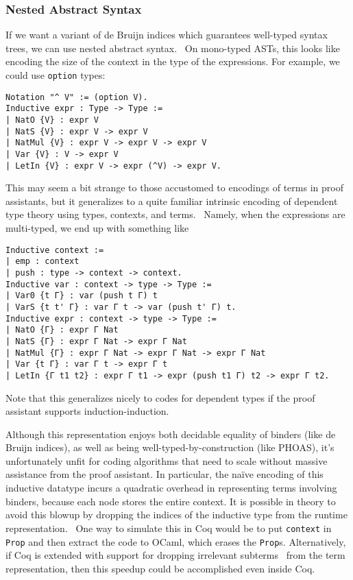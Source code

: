 \subsubsection{Nested Abstract Syntax} \label{sec:binders:nested-abstract-syntax}
If we want a variant of de Bruijn indices which guarantees well-typed syntax trees, we can use nested abstract syntax.~\cite{Nested2012Hirschowitz,deBruijn1999Bird}
On mono-typed ASTs, this looks like encoding the size of the context in the type of the expressions.
For example, we could use \texttt{option} types:~\cite{Nested2012Hirschowitz}
\begin{verbatim}
Notation "^ V" := (option V).
Inductive expr : Type -> Type :=
| NatO {V} : expr V
| NatS {V} : expr V -> expr V
| NatMul {V} : expr V -> expr V -> expr V
| Var {V} : V -> expr V
| LetIn {V} : expr V -> expr (^V) -> expr V.
\end{verbatim}

This may seem a bit strange to those accustomed to encodings of terms in proof assistants, but it generalizes to a quite familiar intrinsic encoding of dependent type theory using types, contexts, and terms.~\cite{Strongly2012Benton}
Namely, when the expressions are multi-typed, we end up with something like
\begin{verbatim}
Inductive context :=
| emp : context
| push : type -> context -> context.
Inductive var : context -> type -> Type :=
| Var0 {t Γ} : var (push t Γ) t
| VarS {t t' Γ} : var Γ t -> var (push t' Γ) t.
Inductive expr : context -> type -> Type :=
| NatO {Γ} : expr Γ Nat
| NatS {Γ} : expr Γ Nat -> expr Γ Nat
| NatMul {Γ} : expr Γ Nat -> expr Γ Nat -> expr Γ Nat
| Var {t Γ} : var Γ t -> expr Γ t
| LetIn {Γ t1 t2} : expr Γ t1 -> expr (push t1 Γ) t2 -> expr Γ t2.
\end{verbatim}

Note that this generalizes nicely to codes for dependent types if the proof assistant supports induction-induction.

Although this representation enjoys both decidable equality of binders (like de Bruijn indices), as well as being well-typed-by-construction (like PHOAS), it's unfortunately unfit for coding algorithms that need to scale without massive assistance from the proof assistant.
In particular, the naïve encoding of this inductive datatype incurs a quadratic overhead in representing terms involving binders, because each node stores the entire context.
It is possible in theory to avoid this blowup by dropping the indices of the inductive type from the runtime representation.~\cite{Inductive2003Brady}
One way to simulate this in Coq would be to put \texttt{context} in \texttt{Prop} and then extract the code to OCaml, which erases the \texttt{Prop}s.
Alternatively, if Coq is extended with support for dropping irrelevant subterms~\cite{sprop} from the term representation, then this speedup could be accomplished even inside Coq.

